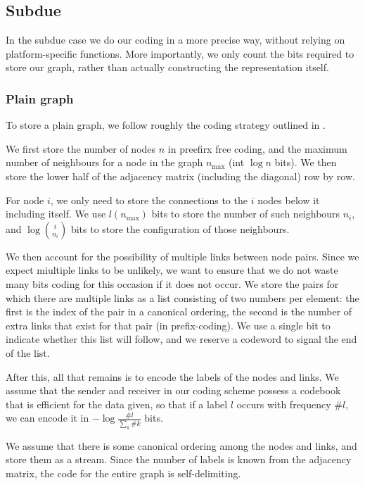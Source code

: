 \documentclass{article}
\begin{document}
\subsection*{Subdue}

In the subdue case we do our coding in a more precise way, without relying on platform-specific functions. More importantly, we only count the bits required to store our graph, rather than actually constructing the representation itself.

\subsubsection*{Plain graph}

To store a plain graph, we follow roughly the coding strategy outlined in . 

We first store the number of nodes $n$ in preefirx free coding, and the maximum number of neighbours for a node in the graph $n_{\mbox{max}}$ (int $\log n$ bits). We then store the lower half of the adjacency matrix (including the diagonal) row by row.

For node $i$, we only need to store the connections to the $i$ nodes below it including itself. We use $l(n_{\mbox{max}})$ bits to store the number of such neighbours $n_i$, and $\log{i \choose n_i}$ bits to store the configuration of those neighbours.

We then account for the possibility of multiple links between node pairs. Since we expect miultiple links to be unlikely, we want to ensure that we do not waste many bits coding for this occasion if it does not occur. We store the pairs for which there are multiple links as a list consisting of two numbers per element: the first is the index of the pair in a canonical ordering, the second is the number of extra links that exist for that pair (in prefix-coding). We use a single bit to indicate whether this list will follow, and we reserve a codeword to signal the end of the list.

After this, all that remains is to encode the labels of the nodes and links. We assume that the sender and receiver in our coding scheme possess a codebook that is efficient for the data given, so that if a label $l$ occurs with frequency $\#l$, we can encode it in $-\log \frac{\#l}{\sum_k \#k}$ bits. 

We assume that there is some canonical ordering among the nodes and links, and store them as a stream. Since the number of labels is known from the adjacency matrix, the code for the entire graph is self-delimiting.
\end{document}
